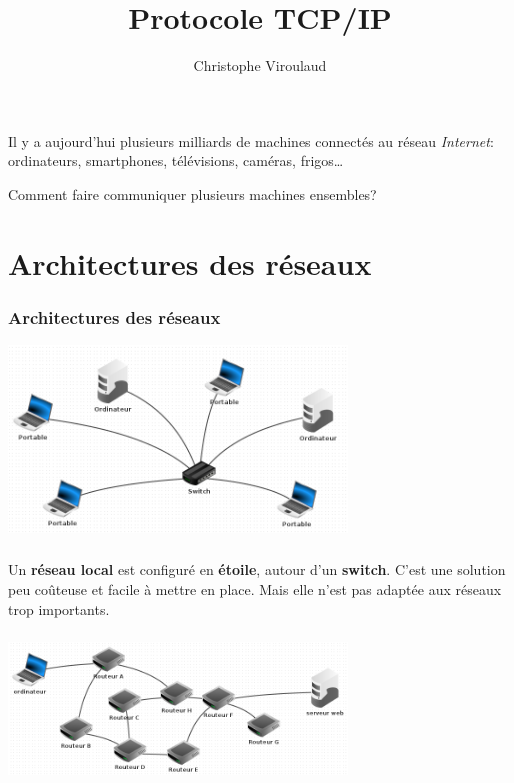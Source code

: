 \documentclass[svgnames,11pt]{beamer}
\author[]{Christophe Viroulaud}
\title{Protocole TCP/IP}
\date{\framebox{\textbf{ArchMat 11}}}
\institute{ Première - NSI }
\begin{document}
\begin{frame}
\titlepage
\end{frame}
\begin{frame}
    \frametitle{}

    Il y a aujourd'hui plusieurs milliards de machines connectés au réseau \emph{Internet}: ordinateurs, smartphones, télévisions, caméras, frigos\dots
\begin{framed}
    \centering Comment faire communiquer plusieurs machines ensembles?
\end{framed}
\end{frame}
\section{Architectures des réseaux}
\begin{frame}
    \frametitle{Architectures des réseaux}

    \begin{center}
    \centering
    \includegraphics[width=9cm]{ressources/local.png}
    \label{IMG}
    \end{center}

\end{frame}
\begin{frame}
    \frametitle{}
\begin{aretenir}[]
Un \textbf{réseau local} est configuré en \textbf{étoile}, autour d'un \textbf{switch}. C'est une solution peu coûteuse et facile à mettre en place. Mais elle n'est pas adaptée aux réseaux trop importants.
\end{aretenir}
    

\end{frame}
\begin{frame}
    \frametitle{}

    \begin{center}
    \centering
    \includegraphics[width=9cm]{ressources/maille.png}
    \label{IMG}
    \end{center}

\end{frame}
\end{document}
